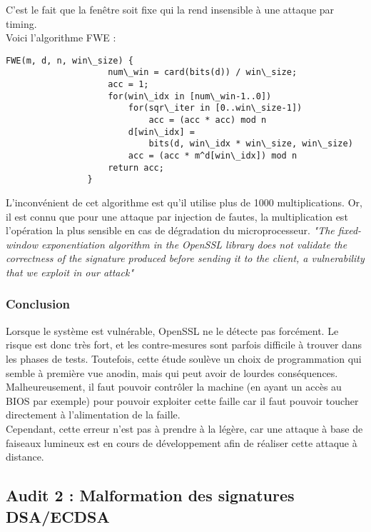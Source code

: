 			C'est le fait que la fenêtre soit fixe qui la rend insensible à une attaque par timing.\\

			Voici l'algorithme FWE :
		
			\begin{lstlisting}[style=customc,caption=fwe.c, label=fwe]
				FWE(m, d, n, win\_size) {
					num\_win = card(bits(d)) / win\_size;
					acc = 1;
					for(win\_idx in [num\_win-1..0])
						for(sqr\_iter in [0..win\_size-1])
							acc = (acc * acc) mod n
						d[win\_idx] =
							bits(d, win\_idx * win\_size, win\_size)
						acc = (acc * m^d[win\_idx]) mod n
					return acc;
				}
			\end{lstlisting}
		

			L'inconvénient de cet algorithme est qu'il utilise plus de 1000 multiplications. Or, il est connu que pour une attaque par injection de fautes, la multiplication est l'opération la plus sensible en cas de dégradation du microprocesseur. \textit{"The fixed-window exponentiation algorithm in the OpenSSL library does not validate the correctness of the signature produced before sending it to the client, a vulnerability that we exploit in our attack"}\\
			

		\subsubsection{Conclusion}

			Lorsque le système est vulnérable, OpenSSL ne le détecte pas forcément. Le risque est donc très fort, et les contre-mesures sont parfois difficile à trouver dans les phases de tests. Toutefois, cette étude soulève un choix de programmation qui semble à première vue anodin, mais qui peut avoir de lourdes conséquences.\\

			Malheureusement, il faut pouvoir contrôler la machine (en ayant un accès au BIOS par exemple) pour pouvoir exploiter cette faille car il faut pouvoir toucher directement à l'alimentation de la faille.\\

			Cependant, cette erreur n'est pas à prendre à la légère, car une attaque à base de faiseaux lumineux est en cours de développement afin de réaliser cette attaque à distance.
		
\subsection{Audit 2 : Malformation des signatures DSA/ECDSA}
